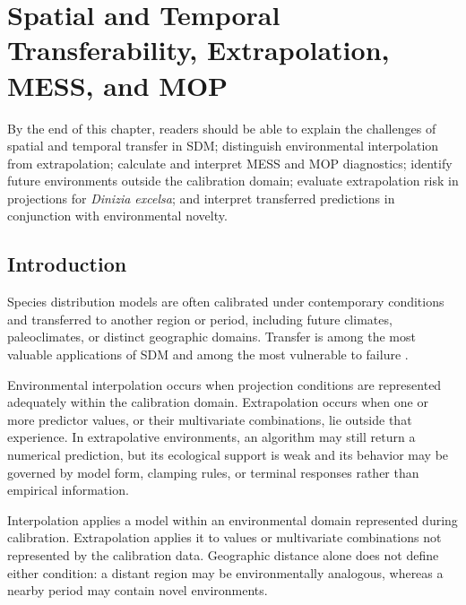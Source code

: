\chapter[Transferability and extrapolation]{Spatial and Temporal Transferability, Extrapolation, MESS, and MOP}

\begin{objetivos}
By the end of this chapter, readers should be able to explain the challenges of spatial and temporal transfer in SDM; distinguish environmental interpolation from extrapolation; calculate and interpret MESS and MOP diagnostics; identify future environments outside the calibration domain; evaluate extrapolation risk in projections for \textit{Dinizia excelsa}; and interpret transferred predictions in conjunction with environmental novelty.
\end{objetivos}

\section{Introduction}

Species distribution models are often calibrated under contemporary conditions and transferred to another region or period, including future climates, paleoclimates, or distinct geographic domains. Transfer is among the most valuable applications of SDM and among the most vulnerable to failure \parencite{peterson2011,araujo2012,yates2018transferability,zurell2020benchmarking}.

Environmental interpolation occurs when projection conditions are represented adequately within the calibration domain. Extrapolation occurs when one or more predictor values, or their multivariate combinations, lie outside that experience. In extrapolative environments, an algorithm may still return a numerical prediction, but its ecological support is weak and its behavior may be governed by model form, clamping rules, or terminal responses rather than empirical information.

\begin{conceito}[title={\faBook\quad Interpolation versus extrapolation}]
Interpolation applies a model within an environmental domain represented during calibration. Extrapolation applies it to values or multivariate combinations not represented by the calibration data. Geographic distance alone does not define either condition: a distant region may be environmentally analogous, whereas a nearby period may contain novel environments.
\end{conceito}

